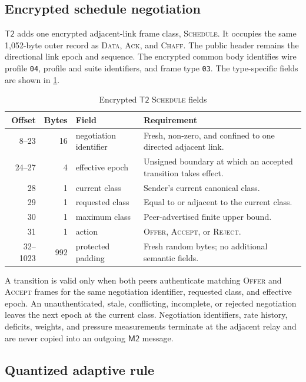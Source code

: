\documentclass[11pt,oneside]{article}
\newcommand{\Mtwo}{\ensuremath{\mathsf{M2}}}
\newcommand{\Ttwo}{\ensuremath{\mathsf{T2}}}
\newcommand{\code}[1]{\texttt{#1}}
\begin{document}
\subsection{Encrypted schedule negotiation}

\Ttwo{} adds one encrypted adjacent-link frame class, \textsc{Schedule}. It occupies the same 1,052-byte outer record as \textsc{Data}, \textsc{Ack}, and \textsc{Chaff}. The public header remains the directional link epoch and sequence. The encrypted common body identifies wire profile \code{04}, profile and suite identifiers, and frame type \code{03}. The type-specific fields are shown in \cref{tab:t2schedule}.

\begin{table}[ht]
\centering
\caption{Encrypted \Ttwo{} \textsc{Schedule} fields}
\label{tab:t2schedule}
\begin{tabularx}{\textwidth}{@{}r r p{}X@{}}
\toprule
Offset & Bytes & Field & Requirement \\
\midrule
8--23 & 16 & negotiation identifier & Fresh, non-zero, and confined to one directed adjacent link. \\
24--27 & 4 & effective epoch & Unsigned boundary at which an accepted transition takes effect. \\
28 & 1 & current class & Sender's current canonical class. \\
29 & 1 & requested class & Equal to or adjacent to the current class. \\
30 & 1 & maximum class & Peer-advertised finite upper bound. \\
31 & 1 & action & \textsc{Offer}, \textsc{Accept}, or \textsc{Reject}. \\
32--1023 & 992 & protected padding & Fresh random bytes; no additional semantic fields. \\
\bottomrule
\end{tabularx}
\end{table}

A transition is valid only when both peers authenticate matching \textsc{Offer} and \textsc{Accept} frames for the same negotiation identifier, requested class, and effective epoch. An unauthenticated, stale, conflicting, incomplete, or rejected negotiation leaves the next epoch at the current class. Negotiation identifiers, rate history, deficits, weights, and pressure measurements terminate at the adjacent relay and are never copied into an outgoing \Mtwo{} message.

\subsection{Quantized adaptive rule}
\end{document}
